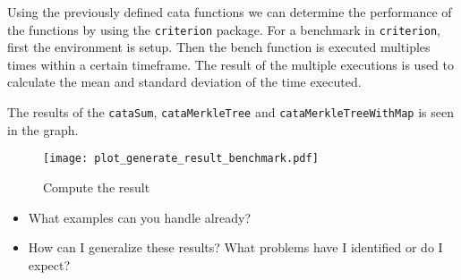 Using the previously defined cata functions we can determine the performance of the functions by using the \texttt{criterion}\cite{HaskellCriterion} package. For a benchmark in \texttt{criterion}, first the environment is setup. Then the bench function is executed multiples times within a certain timeframe. The result of the multiple executions is used to calculate the mean and standard deviation of the time executed. 

The results of the \texttt{cataSum}, \texttt{cataMerkleTree} and \texttt{cataMerkleTreeWithMap} is seen in the graph. 

\begin{figure}[H]
  \centering
  
  \texttt{[image: plot\_generate\_result\_benchmark.pdf]}
  \caption{Compute the result}
  \label{fig-compute-result}
\end{figure}



\begin{itemize}
  \item What examples can you handle already?
  \item How can I generalize these results? What problems have I identified or do I expect?
\end{itemize}